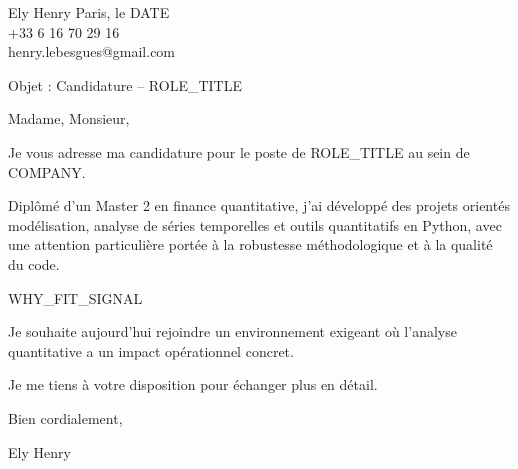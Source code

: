 \documentclass[10pt,a4paper]{article}
\begin{document}
\noindent Ely Henry \hfill Paris, le {{DATE}} \\
+33 6 16 70 29 16 \\
henry.lebesgues@gmail.com \\

\vspace{1cm}

\noindent Objet : Candidature – {{ROLE_TITLE}}

\vspace{0.5cm}

Madame, Monsieur,

\vspace{0.5cm}
Je vous adresse ma candidature pour le poste de {{ROLE_TITLE}} au sein de {{COMPANY}}.

Diplômé d’un Master 2 en finance quantitative, j’ai développé des projets orientés modélisation, analyse de séries temporelles et outils quantitatifs en Python, avec une attention particulière portée à la robustesse méthodologique et à la qualité du code.

{{WHY_FIT_SIGNAL}}

Je souhaite aujourd’hui rejoindre un environnement exigeant où l’analyse quantitative a un impact opérationnel concret.

Je me tiens à votre disposition pour échanger plus en détail.

Bien cordialement,

\vspace{1cm}

\noindent Ely Henry
\end{document}
